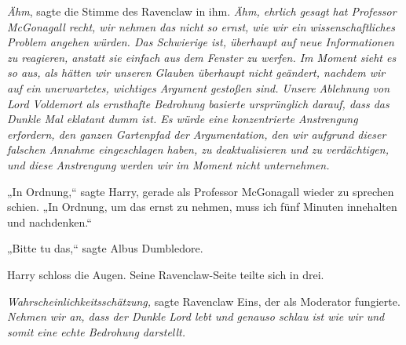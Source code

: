 \emph{Ähm}, sagte die Stimme des Ravenclaw in ihm. \emph{Ähm, ehrlich gesagt hat Professor McGonagall recht, wir nehmen das nicht so ernst, wie wir ein wissenschaftliches Problem angehen würden. Das Schwierige ist, \emph{überhaupt} auf neue Informationen zu reagieren, anstatt sie einfach aus dem Fenster zu werfen. Im Moment sieht es so aus, als hätten wir unseren Glauben \emph{überhaupt nicht} geändert, nachdem wir auf ein unerwartetes, wichtiges Argument gestoßen sind. Unsere Ablehnung von Lord Voldemort als ernsthafte Bedrohung basierte \emph{ursprünglich} darauf, dass das Dunkle Mal eklatant dumm ist. Es würde eine konzentrierte Anstrengung erfordern, den ganzen Gartenpfad der Argumentation, den wir aufgrund dieser falschen Annahme eingeschlagen haben, zu deaktualisieren und zu verdächtigen, und diese Anstrengung werden wir im Moment \emph{nicht} unternehmen.}

„In Ordnung,“ sagte Harry, gerade als Professor McGonagall wieder zu sprechen schien. „In Ordnung, um das ernst zu nehmen, muss ich fünf Minuten innehalten und nachdenken.“

„Bitte tu das,“ sagte Albus Dumbledore.


Harry schloss die Augen. Seine Ravenclaw-Seite teilte sich in drei.

\emph{Wahrscheinlichkeitsschätzung,} sagte Ravenclaw Eins, der als Moderator fungierte. \emph{Nehmen wir an, dass der Dunkle Lord lebt und genauso schlau ist wie wir und somit eine echte Bedrohung darstellt.}

